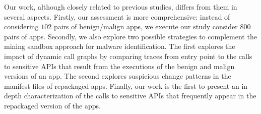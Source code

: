 Our work, although closely related to previous studies, differs from them in several aspects.  Firstly, our assessment is more comprehensive: instead of considering $102$ pairs of benign/malign apps, we execute our study consider {\color{red}800} pairs of apps. Secondly, we also explore two possible strategies to complement the mining sandbox approach for malware identification. The first explores the impact of dynamic call graphs by comparing traces from entry point to the calls to sensitive APIs that result from the executions of the benign and malign versions of an app. The second explores suspicious change patterns in the manifest files of repackaged apps. Finally, our work is the first to present an in-depth characterization of the calls to sensitive APIs that frequently appear in the repackaged version of the apps.
